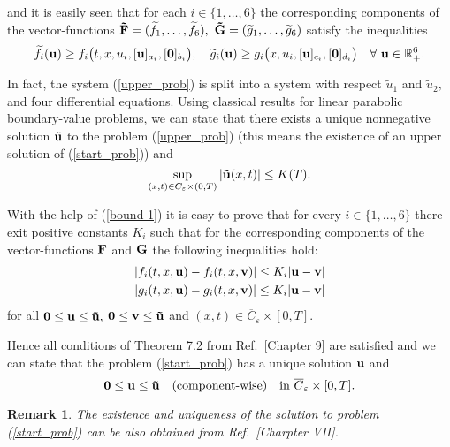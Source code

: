 \documentclass[reqno]{amsart}            %
\newtheorem{remark}{Remark}[section]
\numberwithin{equation}{section}
\begin{document}
and it is easily seen that for each $i\in \{1,\ldots,6\}$ the corresponding components of the vector-functions
${\bf \tilde F}=(\widetilde{f}_1,\ldots,\widetilde{f}_6),$ ${\bf \tilde G}= (\widetilde{g}_1,\ldots,\widetilde{g}_6)$ satisfy the inequalities
$$
\widetilde{f}_i({\bf u}) \ge f_i\big(t,x,u_i, [{\bf u}]_{a_i}, [{\bf 0}]_{b_i}\big)
, \quad
\widetilde{g}_i({\bf u}) \ge g_i\big(x,u_i, [{\bf u}]_{c_i}, [{\bf 0} ]_{d_i}\big) \quad \forall \ {\bf u} \in \Bbb R^6_+.
$$


In fact, the system (\ref{upper_prob}) is split into a system with respect $\widetilde{u}_1$ and $\widetilde{u}_2,$ and
four differential equations. Using classical results for linear parabolic boundary-value problems, we can state that
there exists a unique nonnegative solution ${\bf \tilde u}$ to the problem (\ref{upper_prob}) (this means the existence of an upper solution of (\ref{start_prob}))
and
\begin{equation}\label{bound-1}
  \sup_{(x,t) \in C_\varepsilon \times (0,T)} \left| {\bf \tilde u}(x,t) \right|   \le K(T).
\end{equation}

With the help of (\ref{bound-1}) it is easy to prove that for every $i\in\{1,\ldots,6\}$ there exit positive constants $K_i$ such that for the corresponding
components of the vector-functions  ${\bf F}$ and ${\bf G}$ the following inequalities hold:
\begin{gather}
  \left| f_i(t,x,{\bf u}) - f_i(t,x,{\bf v})  \right| \le K_i | {\bf u} - {\bf v}| \label{bound-2}
  \\
  \left| g_i(t,x,{\bf u}) - g_i(t,x,{\bf v})  \right| \le K_i | {\bf u} - {\bf v}| \label{bound-3}
\end{gather}
for all ${\bf 0}\le {\bf u} \le {\bf \tilde u},$ ${\bf 0}\le  {\bf v} \le {\bf \tilde{u}}$ and $(x, t) \in \overline{C}_\varepsilon \times [0,T].$

Hence all conditions of Theorem 7.2 from Ref.~\cite{Pao}[Chapter 9] are satisfied and we can state that the problem (\ref{start_prob}) has a unique solution ${\bf u}$ and
\begin{equation}\label{bound-4}
{\bf 0}\le {\bf u} \le {\bf \tilde{u}} \quad (\text{component-wise}) \quad \text{in} \ \overline{C}_\varepsilon \times [0,T].
\end{equation}

\begin{remark}
The existence and uniqueness of the solution to problem (\ref{start_prob})
can be also obtained from Ref.~\cite{LadColUra}[Charpter VII].
\end{remark}
\end{document}
